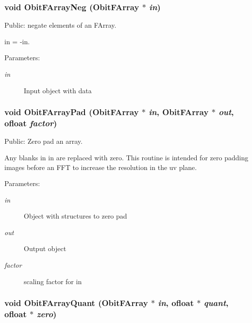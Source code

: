 \subsubsection{\setlength{\rightskip}{0pt plus 5cm}void Obit\-FArray\-Neg ({\bf Obit\-FArray} $\ast$ {\em in})}\label{ObitFArray_8h_a77}


Public: negate elements of an FArray. 

in = -in. \begin{Desc}
\item[Parameters:]
\begin{description}
\item[{\em in}]Input object with data \end{description}
\end{Desc}
\subsubsection{\setlength{\rightskip}{0pt plus 5cm}void Obit\-FArray\-Pad ({\bf Obit\-FArray} $\ast$ {\em in}, {\bf Obit\-FArray} $\ast$ {\em out}, {\bf ofloat} {\em factor})}\label{ObitFArray_8h_a106}


Public: Zero pad an array. 

Any blanks in in are replaced with zero. This routine is intended for zero padding images before an FFT to increase the resolution in the uv plane. \begin{Desc}
\item[Parameters:]
\begin{description}
\item[{\em in}]Object with structures to zero pad \item[{\em out}]Output object \item[{\em factor}]scaling factor for in \end{description}
\end{Desc}
\subsubsection{\setlength{\rightskip}{0pt plus 5cm}void Obit\-FArray\-Quant ({\bf Obit\-FArray} $\ast$ {\em in}, {\bf ofloat} $\ast$ {\em quant}, {\bf ofloat} $\ast$ {\em zero})}\label{ObitFArray_8h_a73}


